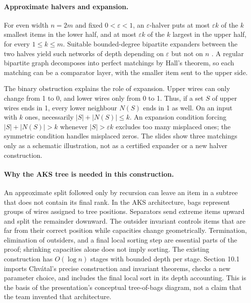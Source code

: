 \documentclass[11pt]{article}
\begin{document}
\paragraph{Approximate halvers and expansion.}
For even width $n=2m$ and fixed $0<\varepsilon<1$, an $\varepsilon$-halver puts at most $\varepsilon k$ of the $k$ smallest items in the lower half, and at most $\varepsilon k$ of the $k$ largest in the upper half, for every $1\le k\le m$. Suitable bounded-degree bipartite expanders between the two halves yield such networks of depth depending on $\varepsilon$ but not on $n$ \cite{aks}. A regular bipartite graph decomposes into perfect matchings by Hall's theorem, so each matching can be a comparator layer, with the smaller item sent to the upper side.

The binary obstruction explains the role of expansion. Upper wires can only change from 1 to 0, and lower wires only from 0 to 1. Thus, if a set $S$ of upper wires ends in 1, every lower neighbour $N(S)$ ends in 1 as well. On an input with $k$ ones, necessarily $|S|+|N(S)|\le k$. An expansion condition forcing $|S|+|N(S)|>k$ whenever $|S|>\varepsilon k$ excludes too many misplaced ones; the symmetric condition handles misplaced zeros. The slides show three matchings only as a schematic illustration, not as a certified expander or a new halver construction.

\paragraph{Why the AKS tree is needed in this construction.}
An approximate split followed only by recursion can leave an item in a subtree that does not contain its final rank. In the AKS architecture, bags represent groups of wires assigned to tree positions. Separators send extreme items upward and split the remainder downward. The outsider invariant controls items that are far from their correct position while capacities change geometrically. Termination, elimination of outsiders, and a final local sorting step are essential parts of the proof; shrinking capacities alone does not imply sorting. The existing construction has $O(\log n)$ stages with bounded depth per stage. Section 10.1 imports Chv\'atal's precise construction and invariant theorems, checks a new parameter choice, and includes the final local sort in its depth accounting. This is the basis of the presentation's conceptual tree-of-bags diagram, not a claim that the team invented that architecture.
\end{document}
